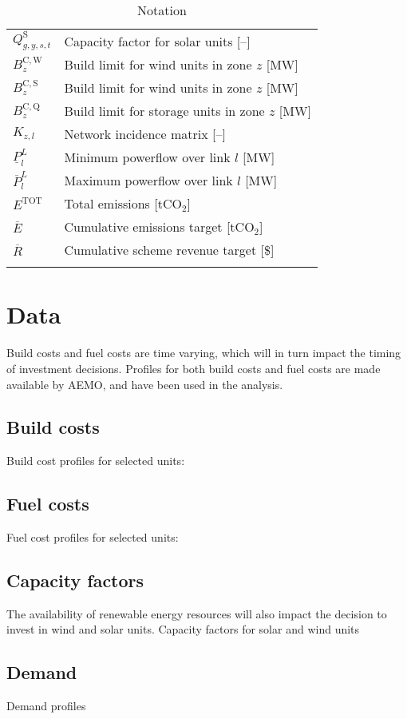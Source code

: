 \documentclass{article}
\newcommand{\iGenerator}{g}
\newcommand{\iYear}{y}
\newcommand{\iScenario}{s}
\newcommand{\iInterval}{t}
\newcommand{\iZone}{z}
\newcommand{\iLink}{l}
\newcommand{\cBuildLimitWind}{B^{\mathrm{C,\mathrm{W}}}_{\iZone}}
\newcommand{\cBuildLimitSolar}{B^{\mathrm{C,\mathrm{S}}}_{\iZone}}
\newcommand{\cBuildLimitStorage}{B^{\mathrm{C,\mathrm{Q}}}_{\iZone}}
\newcommand{\cCapacityFactorSolar}[1][\iGenerator,\iYear,\iScenario,\iInterval]{Q_{#1}^{\mathrm{S}}}
\newcommand{\cIncidenceMatrix}[1][\iZone,\iLink]{K_{#1}}
\newcommand{\cPowerFlowMin}{\underline{P}_{\iLink}^{L}}
\newcommand{\cPowerFlowMax}{\overline{P}_{\iLink}^{L}}
\newcommand{\cEmmissionsCumulativeTarget}{\overline{E}}
\newcommand{\cSchemeRevenueCumulativeTarget}{\overline{R}}
\newcommand{\cEmissionsTotal}{E^{\mathrm{TOT}}}
\begin{document}
\begin{longtable}{ p{}  p{}}
	$\cCapacityFactorSolar$ & Capacity factor for solar units [--]\\
	$\cBuildLimitWind$ & Build limit for wind units in zone $\iZone$ [MW]\\
	$\cBuildLimitSolar$ & Build limit for wind units in zone $\iZone$ [MW]\\
	$\cBuildLimitStorage$ & Build limit for storage units in zone $\iZone$ [MW]\\
	$\cIncidenceMatrix$ & Network incidence matrix [--]\\
	$\cPowerFlowMin$ & Minimum powerflow over link $\iLink$ [MW]\\
	$\cPowerFlowMax$ & Maximum powerflow over link $\iLink$ [MW]\\
	$\cEmissionsTotal$ & Total emissions [tCO$_{2}$]\\
	$\cEmmissionsCumulativeTarget$ & Cumulative emissions target [tCO$_{2}$]\\
	$\cSchemeRevenueCumulativeTarget$ & Cumulative scheme revenue target [\$]\\
	\hline
	\caption{Notation}
\end{longtable}

\section{Data}
Build costs and fuel costs are time varying, which will in turn impact the timing of investment decisions. Profiles for both build costs and fuel costs are made available by AEMO, and have been used in the analysis.

\subsection{Build costs}
Build cost profiles for selected units:

\subsection{Fuel costs}
Fuel cost profiles for selected units:

\subsection{Capacity factors}
The availability of renewable energy resources will also impact the decision to invest in wind and solar units. Capacity factors for solar and wind units 

\subsection{Demand}
Demand profiles
\end{document}
